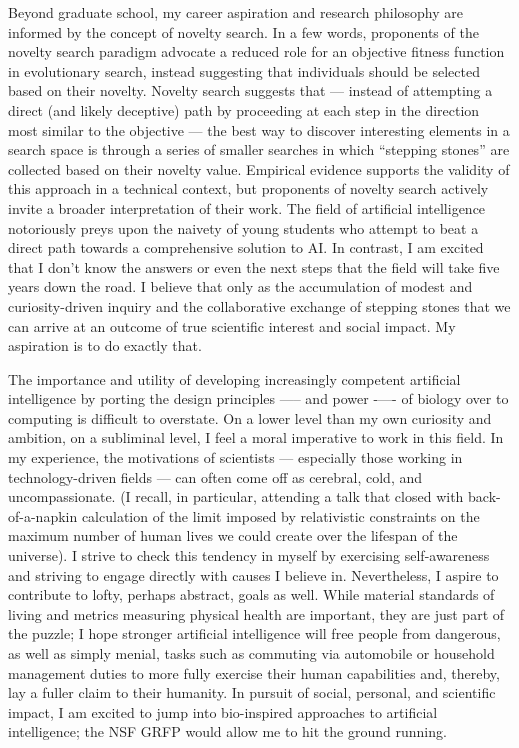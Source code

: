 \documentclass[12pt]{book}
\begin{document}
Beyond graduate school, my career aspiration and research philosophy are informed by the concept of novelty search. In a few words, proponents of the novelty search paradigm advocate a reduced role for an objective fitness function in evolutionary search, instead suggesting that individuals should be selected based on their novelty. Novelty search suggests that --- instead of attempting a direct (and likely deceptive) path by proceeding at each step in the direction most similar to the objective --- the best way to discover interesting elements in a search space is through a series of smaller searches in which ``stepping stones'' are collected based on their novelty value. Empirical evidence supports the validity of this approach in a technical context, but proponents of novelty search actively invite a broader interpretation of their work. The field of artificial intelligence notoriously preys upon the naivety of young students who attempt to beat a direct path towards a comprehensive solution to AI. In contrast, I am excited that I don't know the answers or even the next steps that the field will take five years down the road. I believe that only as the accumulation of modest and curiosity-driven inquiry and the collaborative exchange of stepping stones that we can arrive at an outcome of true scientific interest and social impact. My aspiration is to do exactly that.

The importance and utility of developing increasingly competent artificial intelligence by porting the design principles —-- and power -—- of biology over to computing is difficult to overstate. On a lower level than my own curiosity and ambition, on a subliminal level, I feel a moral imperative to work in this field. In my experience, the motivations of scientists --- especially those working in technology-driven fields --- can often come off as cerebral, cold, and uncompassionate. (I recall, in particular, attending a talk that closed with back-of-a-napkin calculation of the limit imposed by relativistic constraints on the maximum number of human lives we could create over the lifespan of the universe). I strive to check this tendency in myself by exercising self-awareness and striving to engage directly with causes I believe in. Nevertheless, I aspire to contribute to lofty, perhaps abstract, goals as well. While material standards of living and metrics measuring physical health are important, they are just part of the puzzle; I hope stronger artificial intelligence will free people from dangerous, as well as simply menial, tasks such as commuting via automobile or household management duties to more fully exercise their human capabilities and, thereby, lay a fuller claim to their humanity. In pursuit of social, personal, and scientific impact, I am excited to jump into bio-inspired approaches to artificial intelligence; the NSF GRFP would allow me to hit the ground running.
\end{document}
